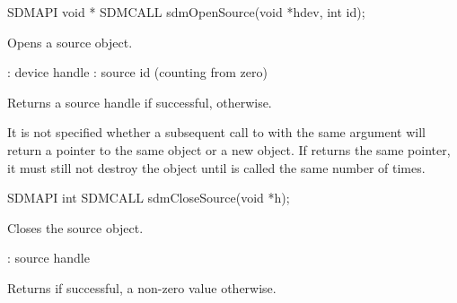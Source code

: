 \documentclass[a4paper,12pt,twoside,extrafontsizes]{memoir}
\begin{document}


\begin{cfuncprototype}
SDMAPI void * SDMCALL sdmOpenSource(void *hdev, int id);
\end{cfuncprototype}

\begin{funcdescr}
	Opens a source object.
\end{funcdescr}

\begin{funcparams}
	: device handle
	: source id (counting from zero)
\end{funcparams}

\begin{funcret}
	Returns a source handle if successful,  otherwise.
\end{funcret}

\begin{funcremarks}
	It is not specified whether a subsequent call to  with the same  argument will return a pointer to the same object or a new object. If  returns the same pointer, it must still not destroy the object until  is called the same number of times.
\end{funcremarks}



\begin{cfuncprototype}
SDMAPI int SDMCALL sdmCloseSource(void *h);
\end{cfuncprototype}

\begin{funcdescr}
	Closes the source object.
\end{funcdescr}

\begin{funcparams}
	: source handle
\end{funcparams}

\begin{funcret}
	Returns  if successful, a non-zero value otherwise.
\end{funcret}

\end{document}
